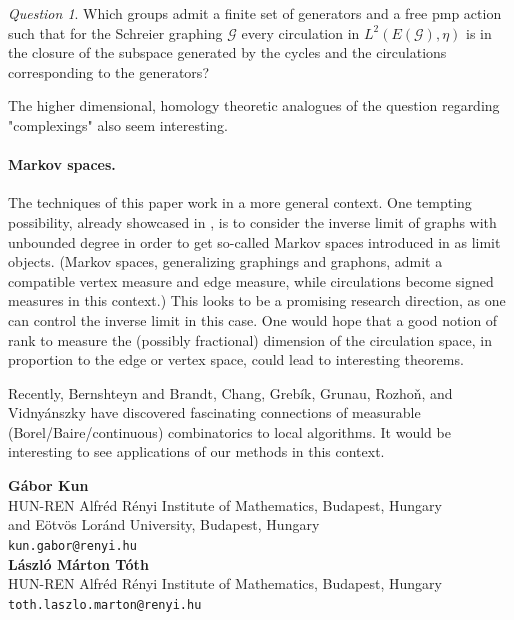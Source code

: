 \documentclass[10pt]{article}
\theoremstyle{plain}
\theoremstyle{remark}
\newtheorem{question}[lemma]{Question}
\newcommand{\1}{\mathbbm{1}}
\numberwithin{equation}{section}
\begin{document}
\begin{question}
Which groups admit a finite set of generators and a free pmp action such that for the Schreier graphing $\mathcal{G}$ every circulation in $L^2(E(\mathcal{G}),\eta)$ is in the closure of the subspace generated by the cycles and the circulations corresponding to the generators?
\end{question}

The higher dimensional, homology theoretic analogues of the question regarding "complexings" also seem interesting.

\paragraph{Markov spaces.} The techniques of this paper work in a more general context. One tempting possibility, already showcased in \cite{kun2021measurable}, is to consider the inverse limit of graphs with unbounded degree in order to get so-called Markov spaces introduced in \cite{lovasz2021flows} as limit objects. (Markov spaces, generalizing graphings and graphons, admit a compatible vertex measure and edge measure, while circulations become signed measures in this context.) This looks to be a promising research direction, as one can  control the inverse limit in this case. One would hope that a good notion of rank to measure the (possibly fractional) dimension of the circulation space, in proportion to the edge or vertex space, could lead to interesting theorems.

\medskip

Recently, Bernshteyn \cite{bernshteyn2023probabilistic} and Brandt, Chang, Grebík, Grunau, Rozho\v{n}, and Vidny\'anszky \cite{brandt2021local} have discovered fascinating connections of measurable (Borel/Baire/continuous) combinatorics to local algorithms. It would be interesting to see applications of our methods in this context.



\bigskip
\noindent
{\bf Gábor Kun}\\
HUN-REN Alfréd Rényi Institute of Mathematics, Budapest, Hungary\\
and Eötvös Loránd University, Budapest, Hungary\\
\texttt{kun.gabor@renyi.hu}
\medskip
\ \\
{\bf László Márton Tóth}\\
HUN-REN Alfréd Rényi Institute of Mathematics, Budapest, Hungary\\
\texttt{toth.laszlo.marton@renyi.hu}
\end{document}
